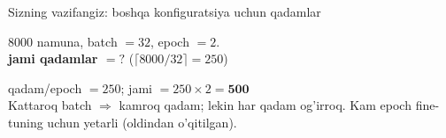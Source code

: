 \documentclass[aspectratio=169,11pt]{beamer}
\begin{document}
\begin{frame}{Sizning vazifangiz: boshqa konfiguratsiya uchun qadamlar}
  \begin{tcolorbox}[warnbox,title=Savol --- 60 soniya]
    \small
    $8000$ namuna, batch $=32$, epoch $=2$.\\[4pt]
    \textbf{\large jami qadamlar $= ?$} \quad
    \footnotesize ($\lceil 8000/32 \rceil = 250$)
  \end{tcolorbox}
  \pause
  \begin{tcolorbox}[okbox,title=Javob]
    \small
    qadam/epoch $= 250$; \quad jami $= 250 \times 2 = \mathbf{500}$\\[3pt]
    \footnotesize Kattaroq batch $\Rightarrow$ kamroq qadam; lekin har qadam
    og'irroq. Kam epoch fine-tuning uchun yetarli (oldindan o'qitilgan).
  \end{tcolorbox}
\end{frame}
\end{document}
